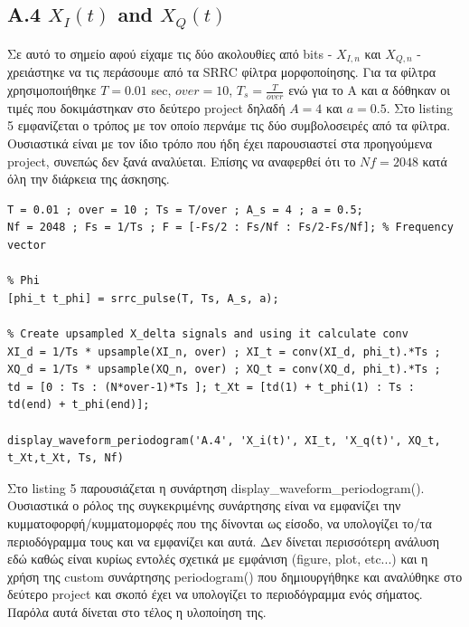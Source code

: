 \documentclass[11pt]{article}
\begin{document}
    \subsection*{A.4 $X_I(t)$ and $X_Q(t)$}
    
    Σε αυτό το σημείο αφού είχαμε τις δύο ακολουθίες από bits - $X_{I,n}$ και $X_{Q,n}$ - χρειάστηκε να τις περάσουμε από τα SRRC φίλτρα μορφοποίησης.
    Για τα φίλτρα χρησιμοποιήθηκε $T=0.01$ sec, $over = 10$, $T_s = \frac{T}{over}$ ενώ για το Α και α δόθηκαν οι τιμές που δοκιμάστηκαν στο δεύτερο project δηλαδή $Α=4$ και $a=0.5$. 
    Στο listing 5 εμφανίζεται ο τρόπος με τον οποίο περνάμε τις δύο συμβολοσειρές από τα φίλτρα. 
    Ουσιαστικά είναι με τον ίδιο τρόπο που ήδη έχει παρουσιαστεί στα προηγούμενα project, συνεπώς δεν ξανά αναλύεται. 
    Επίσης να αναφερθεί ότι το $Nf=2048$ κατά όλη την διάρκεια της άσκησης.
    
    \begin{lstlisting}[caption = {A.4 \texttt{Calculate $X_I(t)$ and $X_Q(t)$}}]
% A.4
T = 0.01 ; over = 10 ; Ts = T/over ; A_s = 4 ; a = 0.5;
Nf = 2048 ; Fs = 1/Ts ; F = [-Fs/2 : Fs/Nf : Fs/2-Fs/Nf]; % Frequency vector

% Phi
[phi_t t_phi] = srrc_pulse(T, Ts, A_s, a);

% Create upsampled X_delta signals and using it calculate conv
XI_d = 1/Ts * upsample(XI_n, over) ; XI_t = conv(XI_d, phi_t).*Ts ;
XQ_d = 1/Ts * upsample(XQ_n, over) ; XQ_t = conv(XQ_d, phi_t).*Ts ;
td = [0 : Ts : (N*over-1)*Ts ]; t_Xt = [td(1) + t_phi(1) : Ts : td(end) + t_phi(end)];

display_waveform_periodogram('A.4', 'X_i(t)', XI_t, 'X_q(t)', XQ_t, t_Xt,t_Xt, Ts, Nf)
    \end{lstlisting}
    
    \par \noindent
    Στο listing 5 παρουσιάζεται η συνάρτηση display\_waveform\_periodogram(). Ουσιαστικά ο ρόλος της συγκεκριμένης συνάρτησης είναι να εμφανίζει 
    την κυμματοφορφή/κυμματομορφές που της δίνονται ως είσοδο, να υπολογίζει το/τα περιοδόγραμμα τους και να εμφανίζει και αυτά. 
    Δεν δίνεται περισσότερη ανάλυση εδώ καθώς είναι κυρίως εντολές σχετικά με εμφάνιση (figure, plot, etc...) και η χρήση της custom συνάρτησης periodogram() που δημιουργήθηκε και αναλύθηκε στο δεύτερο project και σκοπό έχει να υπολογίζει το περιοδόγραμμα ενός σήματος. 
    Παρόλα αυτά δίνεται στο τέλος η υλοποίηση της.
    
\end{document}
